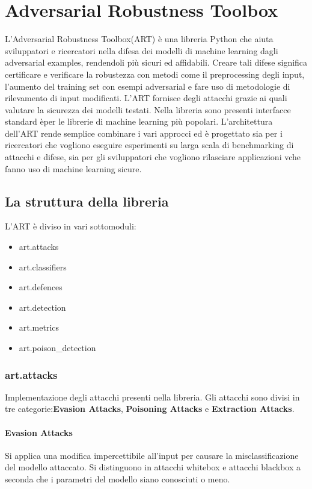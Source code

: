 \newpage
\section{Adversarial Robustness Toolbox}\cite{art2018}
L'Adversarial Robustness Toolbox(ART) è una libreria Python che aiuta sviluppatori e ricercatori nella difesa dei modelli di machine learning dagli adversarial examples, rendendoli più sicuri 
ed affidabili. Creare tali difese significa certificare e verificare la robustezza con metodi come il preprocessing degli input,  l'aumento del training set
con esempi adversarial e fare uso di metodologie di rilevamento di input modificati. L'ART fornisce degli attacchi grazie ai quali valutare la sicurezza dei modelli
testati. Nella libreria sono presenti interfacce standard èper le librerie di machine learning più popolari. L'architettura dell'ART rende semplice combinare i vari approcci  ed è progettato sia per i ricercatori che vogliono eseguire esperimenti su larga scala di benchmarking di attacchi e difese, sia per gli sviluppatori 
che vogliono rilasciare applicazioni vche fanno uso di machine learning sicure.
\subsection{La struttura della libreria}
L'ART è diviso in vari sottomoduli:
\begin{itemize}
    \item art.attacks
    \item art.classifiers
    \item art.defences
    \item art.detection
    \item art.metrics
    \item art.poison\_detection
\end{itemize}

\subsubsection{art.attacks}
Implementazione degli attacchi presenti nella libreria. Gli attacchi sono divisi in tre categorie:\textbf{Evasion Attacks},
\textbf{Poisoning Attacks} e \textbf{Extraction Attacks}.
\paragraph{Evasion Attacks}
Si applica una modifica impercettibile all'input per causare la misclassificazione  del modello attaccato. Si distinguono in attacchi whitebox  e attacchi blackbox a seconda che i parametri del modello
siano conosciuti o meno.

